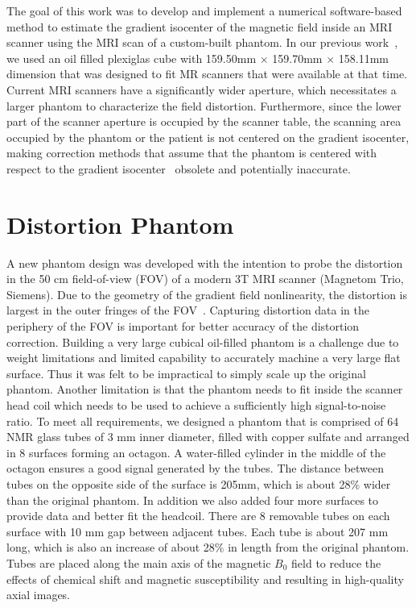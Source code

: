 The goal of this work was to develop and implement a numerical software-based method to estimate the gradient isocenter of the magnetic field inside an MRI scanner using the MRI scan of a custom-built phantom.  In our previous work~\cite{LSS06a,LSS06b,LSS08a,LSS08b}, we used an oil filled plexiglas cube with
159.50mm $\times$ 159.70mm $\times$ 158.11mm dimension that was designed to fit MR scanners that were available at that time.  Current MRI scanners have a significantly wider aperture, which necessitates a larger phantom to characterize the field distortion.  Furthermore, since the lower part of the scanner aperture is occupied by the scanner table, the scanning area occupied by the phantom or the patient is not centered on the gradient isocenter, making correction methods that assume that the phantom is centered with respect to the gradient isocenter~\cite{LSS06a,LSS06b,LSS08a,LSS08b,Lang99} obsolete and potentially inaccurate.

\section{Distortion Phantom}
A new phantom design was developed with the intention to probe the distortion in the 50 cm field-of-view (FOV) of a modern 3T MRI scanner (Magnetom Trio, Siemens).  Due to the geometry of the gradient field nonlinearity, the distortion is largest in the outer fringes of the FOV~\cite{LSS06a,LSS06b,LSS08a,LSS08b}. Capturing distortion data in the periphery of the FOV is important for better accuracy of the distortion correction. Building a very large cubical oil-filled phantom is a challenge due to weight limitations and limited capability to accurately machine a very large flat surface. Thus it was felt to be impractical to simply scale up the original phantom.  Another limitation is that the phantom needs to fit inside the scanner head coil which needs to be used to achieve a sufficiently high signal-to-noise ratio.  To meet all requirements, we designed a phantom that is comprised of 64 NMR glass tubes of 3 mm inner diameter, filled with copper sulfate and arranged in 8 surfaces forming an octagon.  A water-filled cylinder in the middle of the octagon ensures a good signal generated by the tubes.  The distance between tubes on the opposite side of the surface is 205mm, which is about 28\% wider than the original phantom. In addition we also added four more surfaces to provide data and better fit the headcoil.  There are 8 removable tubes on each surface with 10 mm gap between adjacent tubes.  Each tube is about 207 mm long, which is also an increase of about 28\% in length from the original phantom.  Tubes are placed along the main axis of the magnetic $B_0$  field to reduce the effects of chemical shift and magnetic susceptibility and
resulting in high-quality axial images.


